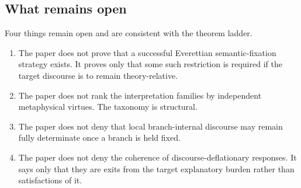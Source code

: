 \subsection{What remains open}

Four things remain open and are consistent with the theorem ladder.
\begin{enumerate}
    \item The paper does not prove that a successful Everettian semantic-fixation strategy exists. It
    proves only that some such restriction is required if the target discourse is to remain
    theory-relative.
    \item The paper does not rank the interpretation families by independent metaphysical virtues.
    The taxonomy is structural.
    \item The paper does not deny that local branch-internal discourse may remain fully determinate
    once a branch is held fixed.
    \item The paper does not deny the coherence of discourse-deflationary responses. It says only that
    they are exits from the target explanatory burden rather than satisfactions of it.
\end{enumerate}
